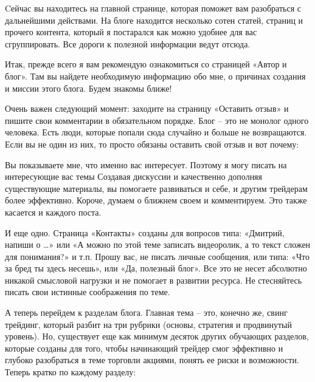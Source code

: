 \documentclass[a5paper]{article}
\begin{document}
Cейчас вы находитесь на главной странице, которая поможет вам разобраться с дальнейшими действами. На блоге находится несколько сотен статей, страниц и прочего контента, который я постарался как можно удобнее для вас сгруппировать. Все дороги к полезной информации ведут отсюда.

Итак, прежде всего я вам рекомендую ознакомиться со страницей «Автор и блог». Там вы найдете необходимую информацию обо мне, о причинах создания и миссии этого блога. Будем знакомы ближе!

Очень важен следующий момент: заходите на страницу «Оставить отзыв» и пишите свои комментарии в обязательном порядке. Блог – это не монолог одного человека. Есть люди, которые попали сюда случайно и больше не возвращаются. Если вы не один из них, то просто обязаны оставить свой отзыв и вот почему:

Вы показываете мне, что именно вас интересует. Поэтому я могу писать на интересующие вас темы
Создавая дискуссии и качественно дополняя существующие материалы, вы помогаете развиваться и себе, и другим трейдерам более эффективно.
Короче, думаем о ближнем своем и комментируем. Это также касается и каждого поста.

И еще одно. Страница «Контакты» созданы для вопросов типа: «Дмитрий, напиши о …» или «А можно по этой теме записать видеоролик, а то текст сложен для понимания?» и т.п. Прошу вас, не писать личные сообщения, или типа: «Что за бред ты здесь несешь», или «Да, полезный блог». Все это не несет абсолютно никакой смысловой нагрузки и не помогает в развитии ресурса. Не стесняйтесь писать свои истинные соображения по теме.

А теперь перейдем к разделам блога. Главная тема – это, конечно же, свинг трейдинг, который разбит на три рубрики (основы, стратегия и продвинутый уровень). Но, существует еще как минимум десяток других обучающих разделов, которые созданы для того, чтобы начинающий трейдер смог эффективно и глубоко разобраться в теме торговли акциями, понять ее риски и возможности. Теперь кратко по каждому разделу:
\end{document}

